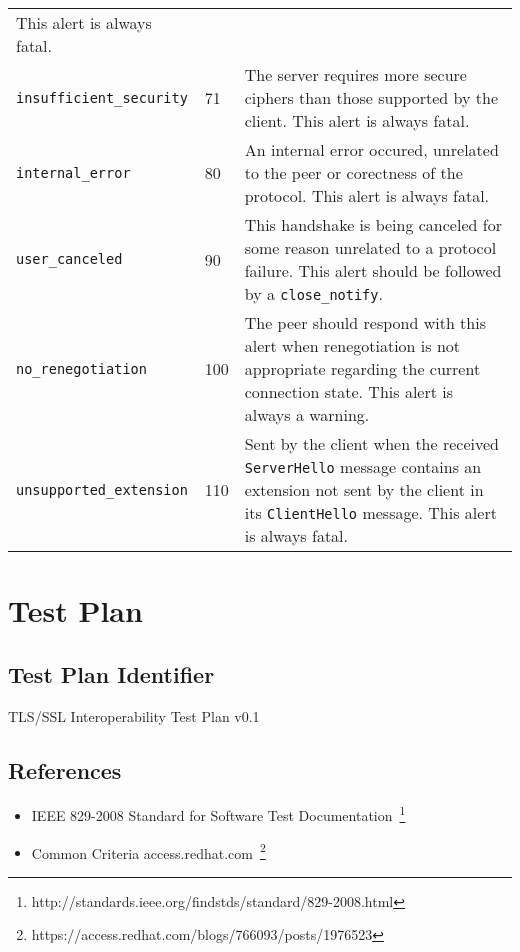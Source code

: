 \begin{tabularx}{\linewidth}{@{}l l X}
                                                  This alert is always fatal. \\
    \texttt{insufficient\_security}       & 71  & The server requires more secure ciphers than those supported by the client. This alert is always fatal. \\
    \texttt{internal\_error}              & 80  & An internal error occured, unrelated to the peer or corectness of the protocol. This alert is always fatal. \\
    \texttt{user\_canceled}               & 90  & This handshake is being canceled for some reason unrelated to a protocol failure. This alert should be followed
                                                  by a \texttt{close\_notify}. \\
    \texttt{no\_renegotiation}            & 100 & The peer should respond with this alert when renegotiation is not appropriate regarding the current connection
                                                  state. This alert is always a warning. \\
    \texttt{unsupported\_extension}       & 110 & Sent by the client when the received \texttt{ServerHello} message contains an extension not sent by the client
                                                  in its \texttt{ClientHello} message. This alert is always fatal.
    \end{tabularx}


\chapter{Test Plan} \label{ref:test-plan}
\section{Test Plan Identifier}
    TLS/SSL Interoperability Test Plan v0.1

\section{References}
    \begin{itemize}
        \item IEEE 829-2008 Standard for Software Test
        Documentation~\footnote{http://standards.ieee.org/findstds/standard/829-2008.html}
        \item Common Criteria \@ access.redhat.com~\footnote{https://access.redhat.com/blogs/766093/posts/1976523}
    \end{itemize}

